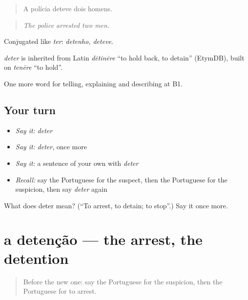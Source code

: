 \begin{quote}
A polícia deteve dois homens.
\end{quote}

\begin{quote}
\emph{The police arrested two men.}
\end{quote}

Conjugated like \emph{ter}: \emph{detenho, deteve}.

\begin{cousinweb}
\emph{deter} is inherited from Latin \emph{dētinēre} \textquotedblleft{}to hold back, to detain\textquotedblright{} (EtymDB), built on \emph{tenēre} \textquotedblleft{}to hold\textquotedblright{}.
\end{cousinweb}

\begin{grammarlens}[title={What you've built}]
One more word for telling, explaining and describing at B1.
\end{grammarlens}

\subsection*{Your turn}
\begin{itemize}
\raggedright
  \item \emph{Say it:} \emph{deter}
  \item \emph{Say it:} \emph{deter}, once more
  \item \emph{Say it:} a sentence of your own with \emph{deter}
  \item \emph{Recall:} say the Portuguese for the suspect, then the Portuguese for the suspicion, then say \emph{deter} again
\end{itemize}

\begin{tcolorbox}[breakable,colback=teal!4,colframe=teal!35!black,title={Before you move on}]
What does deter mean? (\textquotedblleft{}To arrest, to detain; to stop\textquotedblright{}.) Say it once more.
\end{tcolorbox}
\section[a detenção]{a detenção — the arrest, the detention}

\label{lesson:PT-C295-detencao}



\begin{quote}
Before the new one: say the Portuguese for the suspicion, then the Portuguese for to arrest.
\end{quote}


